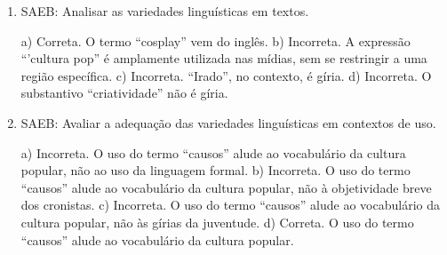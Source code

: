 \begin{enumerate}
	\item
SAEB: Analisar as variedades linguísticas em textos.

a) Correta. O termo ``cosplay'' vem do inglês.
b) Incorreta. A expressão ``'cultura pop'' é amplamente utilizada nas mídias,
sem se restringir a uma região específica.
c) Incorreta. ``Irado'', no contexto, é gíria. 
d) Incorreta. O substantivo ``criatividade'' não é gíria.
	
	\item
SAEB: Avaliar a adequação das variedades linguísticas em contextos de uso.

a) Incorreta. O uso do termo ``causos'' alude ao vocabulário da cultura popular, 
não ao uso da linguagem formal.
b) Incorreta. O uso do termo ``causos'' alude ao vocabulário da cultura popular, 
não à objetividade breve dos cronistas.
c) Incorreta. O uso do termo ``causos'' alude ao vocabulário da cultura popular, 
não às gírias da juventude.
d) Correta. O uso do termo ``causos'' alude ao vocabulário da cultura popular.
\end{enumerate}


